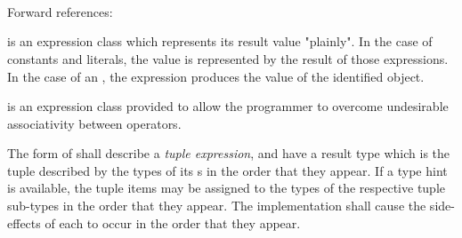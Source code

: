 \begin{grammar}
 \\
	 \\
	 \\
	 \\
	 \\
	 \\

 \\
	 \\
	\terminal{(}  \terminal{)} \\
	\terminal{(}  \terminal{)} \\

 \\
	 \terminal{,}  \optional{\terminal{,}} \\
	 \terminal{,}  \\
\end{grammar}

Forward references: 

\specsubsubitem
{} is an expression class which represents its
result value "plainly". In the case of constants and literals, the value is
represented by the result of those expressions. In the case of an
, the expression produces the value of the identified
object.

\specsubsubitem
{} is an expression class provided to allow the
programmer to overcome undesirable associativity between operators.

\specsubsubitem
The  form of  shall
describe a \textit{tuple expression}, and have a result type which is the tuple
described by the types of its s in the order that they
appear. If a type hint is available, the tuple items may be assigned to the
types of the respective tuple sub-types in the order that they appear. The
implementation shall cause the side-effects of each  to
occur in the order that they appear.


